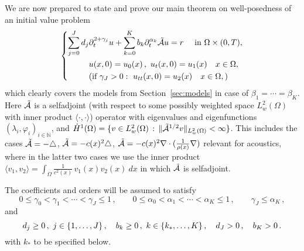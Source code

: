 We are now prepared to state and prove our main theorem on well-posedness of an initial value problem 
\begin{equation}\label{eqn:sumfrac_wave_acou_ibvp}
  \left\{\begin{aligned}
\sum_{j=0}^J d_j &\partial_t^{2+\gamma_j} u + \sum_{k=0}^K b_k \partial_t^{\alpha_k} 
\tilde{\mathcal{A}} u = r\quad \mbox{ in }\Omega\times(0,T),\\
    &u(x,0)  = u_0(x)\,, \ u_t(x,0) = u_1(x) \quad x\in\Omega,\\
&(\mbox{if }\gamma_J>0:\ u_{tt}(x,0) = u_2(x)\quad x\in\Omega,)
  \end{aligned}\right.
\end{equation}
which clearly covers the models from Section~\ref{sec:models} in case of $\beta_1=\cdots=\beta_K$.
Here $\tilde{\mathcal{A}}$ is a selfadjoint (with respect to some possibly weighted space $L^2_w(\Omega)$ with inner product $\langle\cdot,\cdot\rangle$) operator with
eigenvalues and eigenfunctions $(\lambda_i,\varphi_i)_{i\in\mathbb{N}}$,
and $\dot{H}^1(\Omega)=\{v\in L^2_w(\Omega)\, : \, \|\tilde{\mathcal{A}}^{1/2}v\|_{L^2_w(\Omega)}<\infty\}$.
This includes the cases $\tilde{\mathcal{A}}=-\triangle$, $\tilde{\mathcal{A}}=-c(x)^2\triangle$, $\tilde{\mathcal{A}}=-c(x)^2\nabla\cdot(\tfrac{1}{\rho(x)}\nabla)$ relevant for acoustics, where in the latter two cases we use the inner product $\langle v_1,v_2\rangle=\int_\Omega\frac{1}{c^2(x)}\, v_1(x)v_2(x)\ dx$ in which $\tilde{\mathcal{A}}$ is selfadjoint.

The coefficients and orders will be assumed to satisfy 
\begin{equation}\label{eqn:gammaalpha}
0\leq\gamma_0<\gamma_1<\cdots< \gamma_J
 \leq1
\,, \qquad 0\leq\alpha_0<\alpha_1<\cdots< \alpha_K
 \leq1
\,, 
\qquad \gamma_J\leq\alpha_K\,,
\end{equation}
and 
\begin{equation}\label{eqn:dJbK}
d_j\geq0\,, \ j\in\{1,\ldots,J\}\,, \quad b_k\geq 0\,, \ k\in\{\rerevision{k_*},\ldots,K\}\,, \quad d_J>0 \,, \quad b_K>0 \,.
\end{equation} 
with $k_*$ to be specified below.


